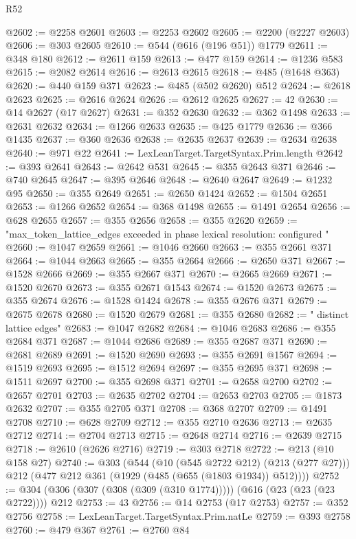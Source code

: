\begin{lexlean}{R52}
\begin{coremodule}
@2602 := @2258 @2601
@2603 := @2253 @2602
@2605 := @2200 (@2227 @2603)
@2606 := @303 @2605
@2610 := @544 (@616 (@196 @51)) @1779
@2611 := @348 @180
@2612 := @2611 @159
@2613 := @477 @159
@2614 := @1236 @583
@2615 := @2082 @2614
@2616 := @2613 @2615
@2618 := @485 (@1648 @363)
@2620 := @440 @159 @371
@2623 := @485 (@502 @2620) @512
@2624 := @2618 @2623
@2625 := @2616 @2624
@2626 := @2612 @2625
@2627 := 42
@2630 := @14 @2627 (@17 @2627)
@2631 := @352 @2630
@2632 := @362 @1498
@2633 := @2631 @2632
@2634 := @1266 @2633
@2635 := @425 @1779
@2636 := @366 @1435
@2637 := @360 @2636
@2638 := @2635 @2637
@2639 := @2634 @2638
@2640 := @971 @22
@2641 := LexLeanTarget.TargetSyntax.Prim.length
@2642 := @393 @2641
@2643 := @2642 @531
@2645 := @355 @2643 @371
@2646 := @740 @2645
@2647 := @395 @2646
@2648 := @2640 @2647
@2649 := @1232 @95
@2650 := @355 @2649
@2651 := @2650 @1424
@2652 := @1504 @2651
@2653 := @1266 @2652
@2654 := @368 @1498
@2655 := @1491 @2654
@2656 := @628 @2655
@2657 := @355 @2656
@2658 := @355 @2620
@2659 := "max_token_lattice_edges exceeded in phase lexical resolution: configured "
@2660 := @1047 @2659
@2661 := @1046 @2660
@2663 := @355 @2661 @371
@2664 := @1044 @2663
@2665 := @355 @2664
@2666 := @2650 @371
@2667 := @1528 @2666
@2669 := @355 @2667 @371
@2670 := @2665 @2669
@2671 := @1520 @2670
@2673 := @355 @2671 @1543
@2674 := @1520 @2673
@2675 := @355 @2674
@2676 := @1528 @1424
@2678 := @355 @2676 @371
@2679 := @2675 @2678
@2680 := @1520 @2679
@2681 := @355 @2680
@2682 := " distinct lattice edges"
@2683 := @1047 @2682
@2684 := @1046 @2683
@2686 := @355 @2684 @371
@2687 := @1044 @2686
@2689 := @355 @2687 @371
@2690 := @2681 @2689
@2691 := @1520 @2690
@2693 := @355 @2691 @1567
@2694 := @1519 @2693
@2695 := @1512 @2694
@2697 := @355 @2695 @371
@2698 := @1511 @2697
@2700 := @355 @2698 @371
@2701 := @2658 @2700
@2702 := @2657 @2701
@2703 := @2635 @2702
@2704 := @2653 @2703
@2705 := @1873 @2632
@2707 := @355 @2705 @371
@2708 := @368 @2707
@2709 := @1491 @2708
@2710 := @628 @2709
@2712 := @355 @2710 @2636
@2713 := @2635 @2712
@2714 := @2704 @2713
@2715 := @2648 @2714
@2716 := @2639 @2715
@2718 := @2610 (@2626 @2716)
@2719 := @303 @2718
@2722 := @213 (@10 @158 @27)
@2740 := @303
    (@544
      (@10 (@545 @2722 @212) (@213 (@277 @27)))
      @212
      (@477 @212 @361 (@1929 (@485 (@655 (@1803 @1934)) @512))))
@2752 := @304 (@306 (@307 (@308 (@309 (@310 @1774))))) (@616 (@23 (@23 (@23 @2722)))) @212
@2753 := 43
@2756 := @14 @2753 (@17 @2753)
@2757 := @352 @2756
@2758 := LexLeanTarget.TargetSyntax.Prim.natLe
@2759 := @393 @2758
@2760 := @479 @367
@2761 := @2760 @84

\end{coremodule}
\end{lexlean}
